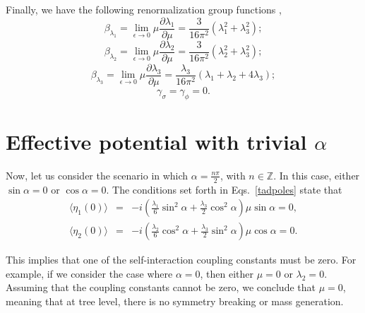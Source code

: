 \documentclass[11pt,a4paper,english,superscriptaddress,preprint,aps,prd]{revtex4}
\begin{document}
Finally, we have the following renormalization group functions \cite{Ookane:2019iwq},
\begin{equation}
 \beta_{\lambda_1}=\lim_{\epsilon\rightarrow0}\mu\frac{\partial\lambda_1}{\partial\mu}=\frac{3}{16\pi^2}(\lambda_1^2+\lambda_3^2);
\end{equation}
\begin{equation}
 \beta_{\lambda_2}=\lim_{\epsilon\rightarrow0}\mu\frac{\partial\lambda_2}{\partial\mu}=\frac{3}{16\pi^2}(\lambda_2^2+\lambda_3^2);
\end{equation}
\begin{equation}
 \beta_{\lambda_3}=\lim_{\epsilon\rightarrow0}\mu\frac{\partial\lambda_3}{\partial\mu}=\frac{\lambda_3}{16\pi^2}(\lambda_1+\lambda_2+4\lambda_3);
\end{equation}
\begin{equation}
 \gamma_\sigma=\gamma_\phi=0.
\end{equation}

\section{Effective potential with trivial $\alpha$}\label{apxB}

Now, let us consider the scenario in which $\alpha=\frac{n\pi}{2}$, with $n\in\mathbb{Z}$. In this case, either $\sin\alpha=0$ or $\cos\alpha=0$. The conditions set forth in Eqs.~\eqref{tadpoles} state that
\begin{eqnarray}
\langle\eta_1(0)\rangle &=& -i\left(\frac{\lambda_1}{6}\sin^2\alpha + \frac{\lambda_3}{2}\cos^2\alpha\right)\mu\sin\alpha = 0, \\
\langle\eta_2(0)\rangle &=& -i\left(\frac{\lambda_2}{6}\cos^2\alpha + \frac{\lambda_3}{2}\sin^2\alpha\right)\mu\cos\alpha = 0.
\end{eqnarray}

\noindent This implies that one of the self-interaction coupling constants must be zero. For example, if we consider the case where $\alpha=0$, then either $\mu=0$ or $\lambda_2=0$. Assuming that the coupling constants cannot be zero, we conclude that $\mu=0$, meaning that at tree level, there is no symmetry breaking or mass generation.
\end{document}
